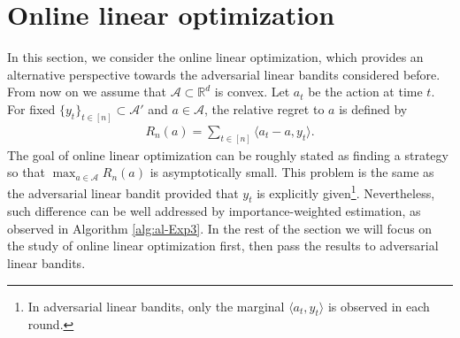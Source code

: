 \documentclass[10pt, openright]{book}
\numberwithin{equation}{section}
\theoremstyle{plain}
\theoremstyle{definition}
\def\R{{\mathbb R}}
\def\R{{\mathbb R}}
\begin{document}
\section{Online linear optimization}

In this section, we consider the online linear optimization, which provides an alternative perspective towards the adversarial linear bandits considered before. 
From now on we assume that $\mathcal A\subset\R^d$ is convex. 
Let $a_t$ be the action at time $t$. For fixed $\{y_t\}_{t\in [n]}\subset \mathcal A'$ and $a\in\mathcal A$, the relative regret to $a$ is defined by 
\begin{align*}
R_n(a) = \sum_{t\in [n]}\langle a_t-a, y_t\rangle. 
\end{align*}
The goal of online linear optimization can be roughly stated as finding a strategy so that $\max_{a\in\mathcal A}R_n(a)$ is asymptotically small. This problem is the same as the adversarial linear bandit provided that $y_t$ is explicitly given\footnote{In adversarial linear bandits, only the marginal $\langle a_t, y_t\rangle$ is observed in each round.}. 
Nevertheless, such difference can be well addressed by importance-weighted estimation, as observed in Algorithm \ref{alg:al-Exp3}. 
In the rest of the section we will focus on the study of online linear optimization first, then pass the results to adversarial linear bandits. 
\end{document}
